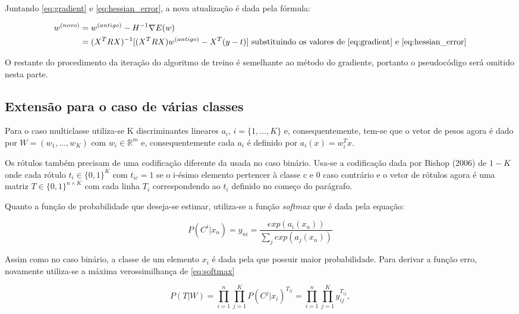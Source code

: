 Juntando \ref{eq:gradient} e \ref{eq:hessian_error}, a nova atualização é dada pela fórmula:

\begin{equation}
	\begin{split}
		w^{ (novo) } & = w^{ (antigo) } - H^{-1} \nabla E(w) \\
		& = (X^T R X)^{-1}[(X^T R X)w^{ (antigo) } - X^T(y - t)] \text{ substituindo os valores de \ref{eq:gradient} e \ref{eq:hessian_error}} 
	\end{split}
\end{equation}

O restante do procedimento da iteração do algoritmo de treino é semelhante ao método do gradiente,
portanto o pseudocódigo será omitido nesta parte.

\subsection{Extensão para o caso de várias classes}

Para o caso multiclasse utiliza-se K discriminantes lineares $a_i$, $i = \{1, \ldots, K\}$ e,
consequentemente, tem-se que o vetor de pesos agora é dado por $W = (w_1, \ldots, w_K)$ com
$w_i \in \mathbb{R}^m$ e, consequentemente cada $a_i$ é definido por $a_i(x) = w_i^Tx$.

Os rótulos também precisam de uma codificação diferente da usada no caso binário. Usa-se a codificação
dada por Bishop (2006)\cite{bishop2006} de $1-K$ onde cada rótulo $t_i \in \{0, 1\}^K$ com
$t_{ic} = 1$ se o i-ésimo elemento pertencer à classe c e 0 caso contrário e o vetor de rótulos
agora é uma matriz $T \in \{0, 1\}^{n \times K}$ com cada linha $T_i$ correspondendo ao
$t_i$ definido no começo do parágrafo.

Quanto a função de probabilidade que deseja-se estimar, utiliza-se a função
\textit{softmax} que é dada pela equação:

\begin{center}
	\begin{equation}
		\label{eq:softmax}
		P(C^i | x_n) = y_{ni} = \frac{exp(a_i(x_n))}{\sum_j exp(a_j(x_n))} 
	\end{equation}
\end{center}

Assim como no caso binário, a classe de um elemento $x_i$ é dada pela que possuir maior probabilidade.
Para derivar a função erro, novamente utiliza-se a máxima verossimilhança de \ref{eq:softmax}

\begin{center}
	\begin{equation}
				P(T | W) = \prod_{i = 1}^{n} \prod_{j = 1}^{K} P(C^j | x_i)^{T_{ij}} = \prod_{i = 1}^{n} \prod_{j = 1}^{K} y_{ij}^{T_{ij}},
	\end{equation}
\end{center}

